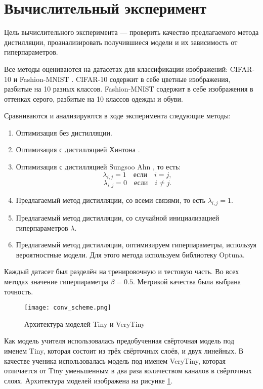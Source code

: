 \section{Вычислительный эксперимент}

Цель вычислительного эксперимента --- проверить качество предлагаемого метода дистилляции,
проанализировать получившиеся модели и их зависимость от гиперпараметров.

Все методы оцениваются на датасетах для классификации изображений: CIFAR-10 \cite{Krizhevsky2009LearningML}  и Fashion-MNIST \cite{xiao2017fashion}.
CIFAR-10 содержит в себе цветные изображения, разбитые на 10 разных классов.
Fashion-MNIST содержит в себе изображения в оттенках серого, разбитые на 10 классов одежды и обуви.

Сравниваются и анализируются в ходе эксперимента следующие методы:

\begin{enumerate}
    \item Оптимизация без дистилляции.
    \item Оптимизация с дистилляцией Хинтона \cite{hinton2015distilling}.
    \item Оптимизация с дистилляцией Sungsoo Ahn \cite{Ahn_2019_CVPR}, то есть:
          $$\lambda_{i,j} = 1 \quad \text{если} \quad i = j,$$
          $$\lambda_{i,j} = 0 \quad \text{если} \quad i \neq j.$$
    \item Предлагаемый метод дистилляции, со всеми связями, то есть $\lambda_{i,j} = 1$.
    \item Предлагаемый метод дистилляции, со случайной инициализацией гиперпараметров $\lambda$.
    \item Предлагаемый метод дистилляции, оптимизируем гиперпараметры, используя вероятностные модели. Для этого метода используем библиотеку Optuna.
\end{enumerate}

Каждый датасет был разделён на тренировочную и тестовую часть. Во всех методах значение гиперпараметра $\beta = 0.5$.
Метрикой качества была выбрана точность.

\begin{figure}[!htbp]
    \centering
    \texttt{[image: conv\_scheme.png]}
    \caption{Архитектура моделей Tiny и VeryTiny}
    \label{fig:model_scheme}
\end{figure}

Как модель учителя использовалась предобученная свёрточная модель под именем Tiny, которая состоит из трёх свёрточных слоёв, и двух линейных.
В качестве ученика использовалась модель под именем VeryTiny, которая отличается от Tiny уменьшенным в два раза количеством каналов в свёрточных слоях.
Архитектура моделей изображена на рисунке \ref{fig:model_scheme}.


